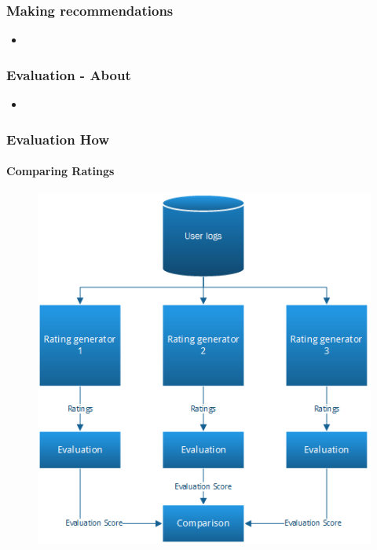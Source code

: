 \documentclass{beamer}
\begin{document}
  \begin{frame}
    \frametitle{Making recommendations}
    \begin{itemize}
      \item
    \end{itemize}
  \end{frame}

  \begin{frame}
    \frametitle{Evaluation - About}
    \begin{itemize}
      \item
    \end{itemize}
  \end{frame}

  \begin{frame}
    \frametitle{Evaluation How}
    \framesubtitle{Comparing Ratings}
    \begin{figure}[H]
        \includegraphics[scale=0.4]{../src/image/ratinggeneval.png}
        \centering
    \end{figure}
  \end{frame}
\end{document}
